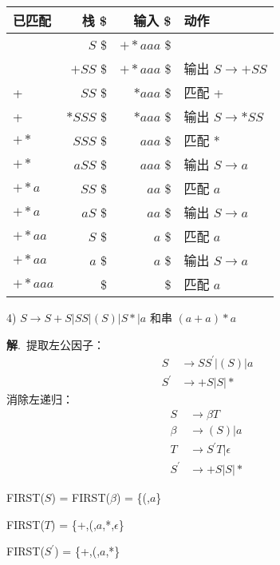 \documentclass[12pt,a4paper]{article}
\newenvironment{problems}{\begin{list}{}{\renewcommand{\makelabel}[1]{\textbf{##1}\hfil}}}{\end{list}}
\providecommand{\sol}{\textbf{解}.~}
\begin{document}
\begin{problems}
        \begin{tabular}{|lr<{\$}r<{\$}l|}
            \hline
            已匹配   & 栈 & 输入 & 动作 \\
            \hline
            & $S$ & $+*aaa$ & \\
            & $+SS$ & $+*aaa$ & 输出 $S\rightarrow +SS$\\
            +& $SS$ & $*aaa$ & 匹配 + \\
            +& $*SSS$ & $*aaa$ & 输出 $S\rightarrow *SS$\\
            $+*$ & $SSS$ & $aaa$ &匹配 * \\
            $+*$ & $aSS$ & $aaa$ & 输出 $S\rightarrow a$ \\
            $+*a$ & $SS$ & $aa$ &匹配 $a$ \\
            $+*a$ & $aS$ & $aa$ & 输出 $S\rightarrow a$ \\
            $+*aa$ & $S$ & $a$ &匹配 $a$ \\
            $+*aa$ & $a$ & $a$ & 输出 $S\rightarrow a$ \\
            $+*aaa$ &  &  &匹配 $a$ \\
            \hline
        \end{tabular}
    
    \item[4)] $S\rightarrow S + S | S S | ( S ) | S * | a$ 和串 $(a+a)*a$
     
        \sol 提取左公因子：
        \begin{align*}
            S &\rightarrow SS^\prime | (S) | a \\
            S^\prime &\rightarrow +S|S|*
        \end{align*}
        消除左递归：
        \begin{align*}
            S &\rightarrow \beta T\\
            \beta &\rightarrow (S) | a\\
            T &\rightarrow S^\prime T | \epsilon \\
            S^\prime &\rightarrow +S|S|*
        \end{align*}

        FIRST($S$) = FIRST($\beta$) = \{(,$a$\}
        
        FIRST($T$) = \{+,(,$a$,*,$\epsilon$\} 
        
        FIRST($S^\prime$) = \{+,(,$a$,*\}


\end{problems}
\end{document}
